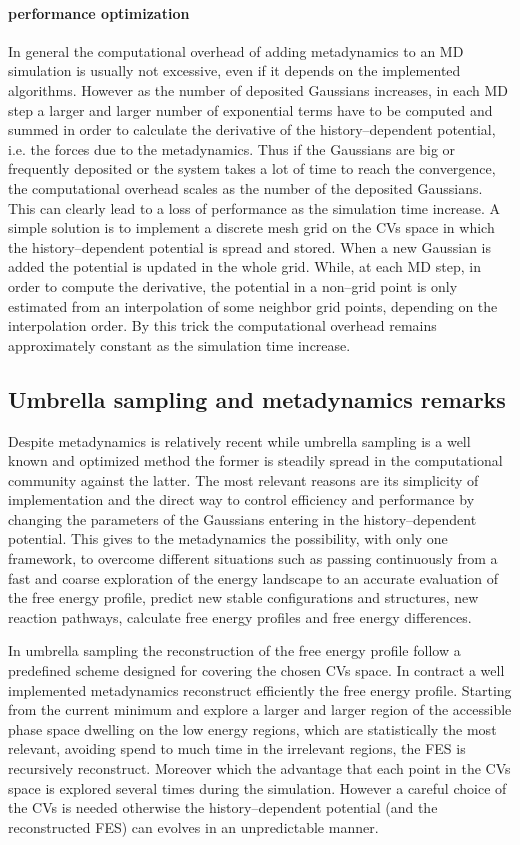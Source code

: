 \paragraph{\textbf{performance optimization}} In general the computational overhead of adding metadynamics to an 
\ac{MD} simulation is usually not excessive, even if it depends on the implemented algorithms. However as the 
number of deposited Gaussians increases, in each \ac{MD} step a larger and larger number of exponential terms have 
to be computed and summed in order to calculate the derivative of the history--dependent potential, i.e. the 
forces due to the metadynamics. Thus if the Gaussians are big or frequently deposited or the system takes a lot of 
time to reach the convergence, the computational overhead scales as the number of the deposited Gaussians. This 
can clearly lead to a loss of performance as the simulation time increase. A simple solution is to implement a 
discrete mesh grid on the \acp{CV} space in which the history--dependent potential is spread and stored. When a 
new Gaussian is added the potential is updated in the whole grid. While, at each \ac{MD} step, in order to compute 
the derivative, the potential in a non--grid point is only estimated from an interpolation of some neighbor grid 
points, depending on the interpolation order. By this trick the computational overhead remains approximately 
constant as the simulation time increase.

\subsection{Umbrella sampling and metadynamics remarks}
Despite metadynamics is relatively recent while umbrella sampling is a well known and optimized method the former is steadily spread in the computational community against the latter. The most relevant reasons are its simplicity of implementation and the direct way to control efficiency and performance by changing the parameters of the Gaussians entering in the history--dependent potential. This gives to the metadynamics the possibility, with only one framework, to overcome different situations such as passing continuously from a fast and coarse exploration of the energy landscape to an accurate evaluation of the free energy profile, predict new stable configurations and structures, new reaction pathways, calculate free energy profiles and free energy differences.

In umbrella sampling the reconstruction of the free energy profile follow a predefined scheme designed for covering the chosen \acp{CV} space. In contract a well implemented metadynamics reconstruct efficiently the free energy profile. Starting from the current minimum and explore a larger and larger region of the accessible phase space dwelling on the low energy regions, which are statistically the most relevant, avoiding spend to much time in the irrelevant regions, the \ac{FES} is recursively reconstruct. Moreover which the advantage that each point in the \acp{CV} space is explored several times during the simulation. However a careful choice of the \acp{CV} is needed otherwise the history--dependent potential (and the reconstructed \ac{FES}) can evolves in an unpredictable manner.   

